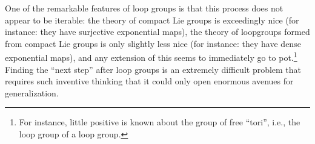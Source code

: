 One of the remarkable features of loop groups is that this process does not appear to be iterable: the theory of compact Lie groups is exceedingly nice (for instance: they have surjective exponential maps), the theory of loopgroups formed from compact Lie groups is only slightly less nice (for instance: they have dense exponential maps), and any extension of this seems to immediately go to pot.\footnote{For instance, little positive is known about the group of free ``tori'', i.e., the loop group of a loop group.}  Finding the ``next step'' after loop groups is an extremely difficult problem that requires such inventive thinking that it could only open enormous avenues for generalization.








